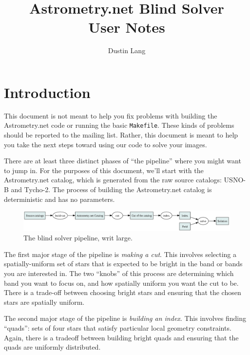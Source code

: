 \documentclass[12pt,letterpaper,titlepage]{article}
\newcommand{\an}{Astrometry.net}
\newcommand{\code}[1]{\texttt{#1}}
\begin{document}
\title{Astrometry.net Blind Solver \\ User Notes}
\author{Dustin Lang}

\maketitle

\newpage

\section{Introduction}

This document is not meant to help you fix problems with building the \an{} code or 
running the basic \code{Makefile}.  These kinds of problems should be reported to the
mailing list.  Rather, this document is meant to help you take the next steps toward
using our code to solve your images.


There are at least three distinct phases of ``the pipeline'' where you might want to
jump in.  For the purposes of this document, we'll start with the Astrometry.net catalog,
which is generated from the raw source catalogs: USNO-B and Tycho-2.  The
process of building the Astrometry.net catalog is deterministic and has no parameters.

\begin{figure}[h!]
\begin{center}
\includegraphics[width=\textwidth]{userdoc-fig-pipeline}
\caption{The blind solver pipeline, writ large.}
\label{fig-pipeline}
\end{center}
\end{figure}

The first major stage of the pipeline is \emph{making a cut}.  This involves selecting a 
spatially-uniform set of stars that is expected to be bright in the band or bands you are
interested in.  The two ``knobs'' of this process are determining which band you want to focus
on, and how spatially uniform you want the cut to be.  There is a trade-off between choosing bright
stars and ensuring that the chosen stars are spatially uniform.

The second major stage of the pipeline is \emph{building an index}.  This involves finding
``quads'': sets of four stars that satisfy particular local geometry constraints.  Again, there
is a tradeoff between building bright quads and ensuring that the quads are uniformly distributed.
\end{document}
